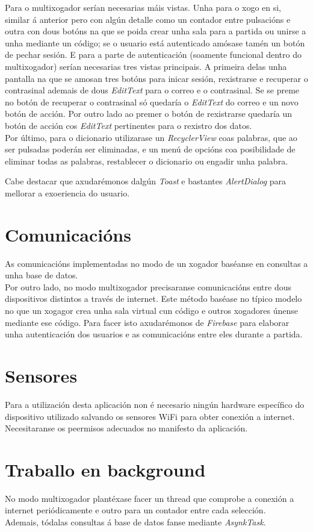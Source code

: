 Para o multixogador serían necesarias máis vistas. Unha para o xogo en si, similar á anterior pero con algún detalle como un contador entre pulsacións e outra con dous botóns na que se poida crear unha sala para a partida ou unirse a unha mediante un código; se o usuario está autenticado amósase tamén un botón de pechar sesión. E para a parte de autenticación (soamente funcional dentro do multixogador) serían necesarias tres vistas principais. A primeira delas unha pantalla na que se amosan tres botóns para inicar sesión, rexistrarse e recuperar o contrasinal ademais de dous \textit{EditText} para o correo e o contrasinal. Se se preme no botón de recuperar o contrasinal só quedaría o \textit{EditText} do correo e un novo botón de acción. Por outro lado ao premer o botón de rexistrarse quedaría un botón de acción cos \textit{EditText} pertinentes para o rexistro dos datos. \\

Por último, para o dicionario utilizarase un \textit{RecyclerView} coas palabras, que ao ser pulsadas poderán ser eliminadas, e un menú de opcións coa posibilidade de eliminar todas as palabras, restablecer o dicionario ou engadir unha palabra.

Cabe destacar que axudarémonos dalgún \textit{Toast} e bastantes \textit{AlertDialog} para mellorar a exoeriencia do usuario.

\section {Comunicacións}
As comunicacións implementadas no modo de un xogador baséanse en consultas a unha base de datos. \\
Por outro lado, no modo multixogador precisaranse comunicacións entre dous dispositivos distintos a través de internet. Este método baséase no típico modelo no que un xogagor crea unha sala virtual cun código e outros xogadores únense mediante ese código. Para facer isto axudarémonos de \textit{Firebase} para elaborar unha autenticación dos usuarios e as comunicacións entre eles durante a partida.

\section {Sensores}
Para a utilización desta aplicación non é necesario ningún hardware específico do dispositivo utilizado salvando os sensores WiFi para obter conexión a internet. Necesitaranse os peermisos adecuados no manifesto da aplicación. 

\section {Traballo en background} 
No modo multixogador plantéxase facer un thread que comprobe a conexión a internet periódicamente e outro para un contador entre cada selección. \\ Ademais, tódalas consultas á base de datos fanse mediante \textit{AsynkTask}.





\let\cleardoublepage=\clearpage
